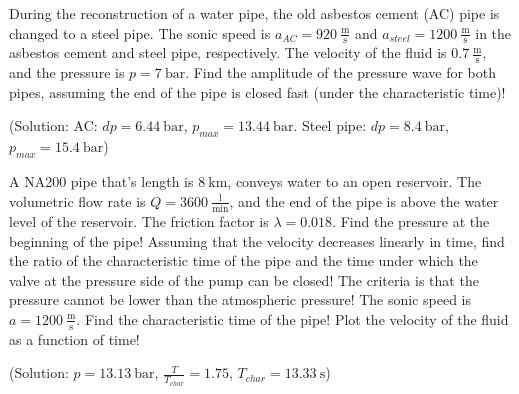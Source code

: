 
\vspace{1cm}

During the reconstruction of a water pipe, the old asbestos cement (AC) pipe is changed to a steel pipe. The sonic speed is $a_{AC}=920~\frac{\mathrm{m}}{\mathrm{s}}$ and $a_{steel}=1200~\frac{\mathrm{m}}{\mathrm{s}}$ in the asbestos cement and steel pipe, respectively. The velocity of the fluid is $0.7~\frac{\mathrm{m}}{\mathrm{s}}$, and the pressure is $p=7~\mathrm{bar}$. Find the amplitude of the pressure wave for both pipes, assuming the end of the pipe is closed fast (under the characteristic time)!

(Solution: AC: $dp=6.44~\mathrm{bar}$, $p_{max} = 13.44~\mathrm{bar}$. Steel pipe: $dp=8.4~\mathrm{bar}$, $p_{max} = 15.4~\mathrm{bar}$)


\vspace{1cm}

A NA200 pipe that's length is $8~\mathrm{km}$, conveys water to an open reservoir. The volumetric flow rate is $Q=3600~\frac{\mathrm{l}}{\mathrm{min}}$, and the end of the pipe is above the water level of the reservoir. The friction factor is $\lambda=0.018$. Find the pressure at the beginning of the pipe! Assuming that the velocity decreases linearly in time, find the ratio of the characteristic time of the pipe and the time under which the valve at the pressure side of the pump can be closed! The criteria is that the pressure cannot be lower than the atmospheric pressure! The sonic speed is $a=1200~\frac{\mathrm{m}}{\mathrm{s}}$. Find the characteristic time of the pipe! Plot the velocity of the fluid as a function of time!

(Solution: $p=13.13~\mathrm{bar}$, $\frac{T}{T_{char}} = 1.75$, $T_{char} = 13.33~\mathrm{s}$)
